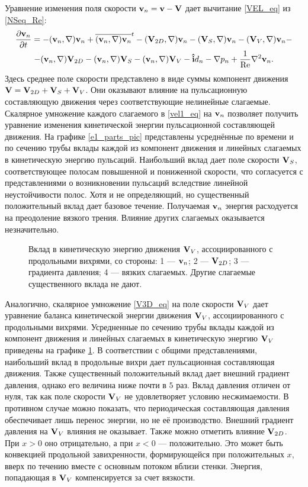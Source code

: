 Уравнение изменения поля скорости $\mathbf{v}_n = \mathbf{v} - \mathbf{V}$ дает вычитание \eqref{VEL_eq} из \eqref{NSeq_Re}:
\begin{multline} \label{vel1_eq}
\frac{\partial \mathbf{v}_n}{\partial t} = - (\mathbf{v}_n, \nabla) \mathbf{v}_n + \overline{(\mathbf{v}_n, \nabla) \mathbf{v}_n}^t - (\mathbf{V}_{2D}, \nabla) \mathbf{v}_n - (\mathbf{V}_S, \nabla) \mathbf{v}_n - (\mathbf{V}_V, \nabla) \mathbf{v}_n - \\ - (\mathbf{v}_n, \nabla) \mathbf{V}_{2D} - (\mathbf{v}_n, \nabla) \mathbf{V}_S - (\mathbf{v}_n, \nabla) \mathbf{V}_V - \mathbf{\hat{i}} d_n - \nabla p_n + \frac{1}{\operatorname{Re}} \nabla^2 \mathbf{v}_n. 
\end{multline}
Здесь среднее поле скорости представлено в виде суммы компонент движения $\mathbf{V} = \mathbf{V}_{2D} + \mathbf{V}_S + \mathbf{V}_V$. Они оказывают влияние на пульсационную составляющую движения через соответствующие нелинейные слагаемые. Скалярное умножение каждого слагаемого в \eqref{vel1_eq} на $\mathbf{v}_n$ позволяет получить уравнение изменения кинетической энергии пульсационной составляющей движения. На графике \ref{e1_parts_pic} представлены усреднённые по времени и по сечению трубы вклады каждой из компонент движения и линейных слагаемых в кинетическую энергию пульсаций. Наибольший вклад дает поле скорости $\mathbf{V}_S$, соответствующее полосам повышенной и пониженной скорости, что согласуется с представлениями о возникновении пульсаций вследствие линейной неустойчивости полос. Хотя и не определяющий, но существенный положительный вклад дает базовое течение. Получаемая $\mathbf{v}_n$ энергия расходуется на преодоление вязкого трения. Влияние других слагаемых оказывается незначительно. 

\begin{figure}
\caption{Вклад в кинетическую энергию движения $\mathbf{V}_V$, ассоциированного с продольными вихрями, со стороны: 1 --- $\mathbf{v}_n$; 2 --- $\mathbf{V}_{2D}$; 3 --- градиента давления; 4 --- вязких слагаемых. Другие слагаемые существенного вклада не дают.}
\label{ev_parts_pic}
\end{figure}

Аналогично, скалярное умножение \eqref{V3D_eq} на поле скорости $\mathbf{V}_V$ дает уравнение баланса кинетической энергии движения $\mathbf{V}_V$, ассоциированного с продольными вихрями. Усредненные по сечению трубы вклады каждой из компонент движения и линейных слагаемых в кинетическую энергию $\mathbf{V}_V$ приведены на графике \ref{ev_parts_pic}. В соответствии с общими представлениями, наибольший вклад в продольные вихри дает пульсационная составляющая движения. Также существенный положительный вклад дает внешний градиент давления, однако его величина ниже почти в $5$ раз. Вклад давления отличен от нуля, так как поле скорости $\mathbf{V}_V$ не удовлетворяет условию несжимаемости. В противном случае можно показать, что периодическая составляющая давления обеспечивает лишь перенос энергии, но не её производство. Внешний градиент давления на $\mathbf{V}_V$ влияния не оказывает. Также можно отметить влияние $\mathbf{V}_{2D}$. При $x > 0$ оно отрицательно, а при $x < 0$ --- положительно. Это может быть конвекцией продольной завихренности, формирующейся при положительных $x$, вверх по течению вместе с основным потоком вблизи стенки. Энергия, попадающая в $\mathbf{V}_V$ компенсируется за счет вязкости. 

